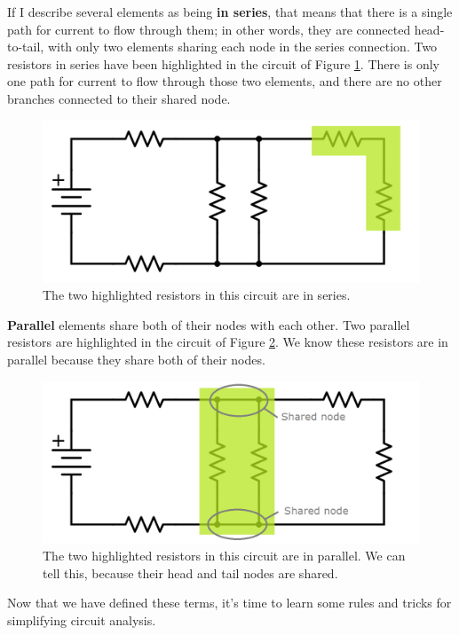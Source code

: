 \par
If I describe several elements as being \textbf{in series}, that means that there is a single path for current to flow through them; in other words, they are connected head-to-tail, with only two elements sharing each node in the series connection. Two resistors in series have been highlighted in the circuit of Figure \ref{seriesHighlighted}. There is only one path for current to flow through those two elements, and there are no other branches connected to their shared node.
\begin{figure}[h!]
\centering
\includegraphics[width=13cm]{figures/seriesHighlighted.png}
\caption{The two highlighted resistors in this circuit are in series.}
\label{seriesHighlighted}
\end{figure}
\par
\textbf{Parallel} elements share both of their nodes with each other. Two parallel resistors are highlighted in the circuit of Figure \ref{parallelHighlighted}. We know these resistors are in parallel because they share both of their nodes.
\begin{figure}[h!]
\centering
\includegraphics[width=13cm]{figures/parallelHighlighted.png}
\caption{The two highlighted resistors in this circuit are in parallel. We can tell this, because their head and tail nodes are shared.}
\label{parallelHighlighted}
\end{figure}
\par
Now that we have defined these terms, it's time to learn some rules and tricks for simplifying circuit analysis.

